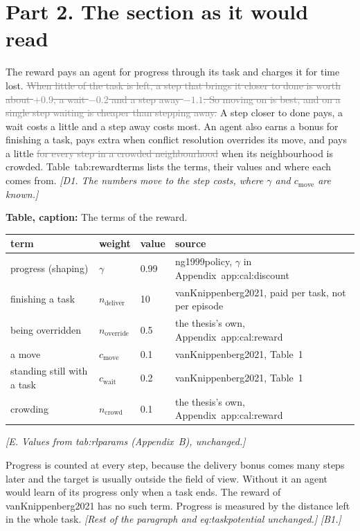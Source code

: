 \documentclass[11pt,a4paper]{article}
\newcommand{\new}[1]{\textcolor{newc}{#1}}
\newcommand{\old}[1]{\textcolor{gray}{\sout{#1}}}
\newcommand{\note}[1]{{\small\itshape [#1]}}
\newcommand{\lab}[1]{\textsf{\footnotesize #1}}
\renewcommand{\ref}[1]{\lab{#1}}
\newcommand{\citet}[1]{\lab{#1}}
\begin{document}
\section*{Part 2. The section as it would read}

The reward pays an agent for progress through its task and charges it for
time lost. \old{When little of the task is left, a step that brings it closer
to done is worth about $+0.9$, a wait $-0.2$ and a step away $-1.1$. So moving
on is best, and on a single step waiting is cheaper than stepping away.}
\new{A step closer to done pays, a wait costs a little and a step away costs
most.} An agent also earns a bonus for finishing a task, pays extra when
conflict resolution overrides its move, and pays a little \old{for every step
in a crowded neighbourhood} \new{when its neighbourhood is crowded.
Table~\ref{tab:rewardterms} lists the terms, their values and where each
comes from}. \note{D1. The numbers move to the step costs, where $\gamma$ and
$c_{\mathrm{move}}$ are known.}

\new{\textbf{Table, caption:} The terms of the reward.}

\begin{center}\small
\begin{tabularx}{\linewidth}{l l l X}
\toprule
term & weight & value & source \\
\midrule
progress (shaping) & $\gamma$ & 0.99 & \citet{ng1999policy}, $\gamma$ in Appendix~\ref{app:cal:discount} \\
finishing a task & $n_{\mathrm{deliver}}$ & 10 & \citet{vanKnippenberg2021}, paid per task, not per episode \\
being overridden & $n_{\mathrm{override}}$ & 0.5 & the thesis's own, Appendix~\ref{app:cal:reward} \\
a move & $c_{\mathrm{move}}$ & 0.1 & \citet{vanKnippenberg2021}, Table~1 \\
standing still with a task & $c_{\mathrm{wait}}$ & 0.2 & \citet{vanKnippenberg2021}, Table~1 \\
crowding & $n_{\mathrm{crowd}}$ & 0.1 & the thesis's own, Appendix~\ref{app:cal:reward} \\
\bottomrule
\end{tabularx}
\end{center}
\note{E. Values from \lab{tab:rlparams} (Appendix~B), unchanged.}

\new{Progress is counted at every step, because the delivery bonus comes many
steps later and the target is usually outside the field of view. Without it
an agent would learn of its progress only when a task ends. The reward of
\citet{vanKnippenberg2021} has no such term.} Progress is measured by the
distance left in the whole task. \emph{[Rest of the paragraph and
\lab{eq:taskpotential} unchanged.]} \note{B1.}
\end{document}
